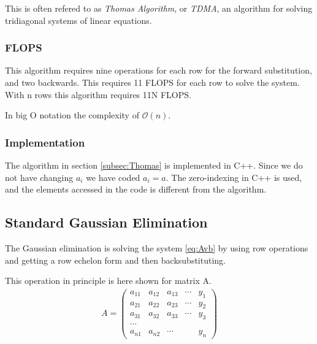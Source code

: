 \documentclass[11pt,a4paper,english,draft]{article}
\numberwithin{equation}{section}
\newcommand{\bigO}[1]{\mathcal{O}\left( #1 \right)}
\begin{document}
This is often refered to as \emph{Thomas Algorithm}, or \emph{TDMA}, an algorithm for solving tridiagonal systems of linear equations. 

\subsubsection{FLOPS}
This algorithm requires nine operations for each row for the forward substitution,
and two backwards. This requires 11 FLOPS for each row to solve the system.
With n rows this algorithm requires 11N FLOPS.

In big O notation the complexity of $\bigO{n}$.

\subsubsection{Implementation}

The algorithm in section \ref{subsec:Thomas} is implemented in C++.
Since we do not have changing $a_i$ we have coded $a_i = a$.
The zero-indexing in C++ is used, and the elements accessed in the code
is different from the algorithm.

\subsection{Standard Gaussian Elimination}

The Gaussian elimination is solving the system \eqref{eq:Avb} by using 
row operations and getting a row echelon form and then backsubstituting.

This operation in principle is here shown for matrix A.
\begin{gather}
A = \begin{pmatrix}
    a_{11} & a_{12} & a_{13} & \cdots & y_1\\
    a_{21} & a_{22} & a_{23} & \cdots& y_2\\
    a_{31} & a_{32} & a_{33} & \cdots & y_3\\
    \cdots \\
    a_{n1} & a_{n2} & \cdots & & y_n
    \end{pmatrix}
\end{gather}
\end{document}
